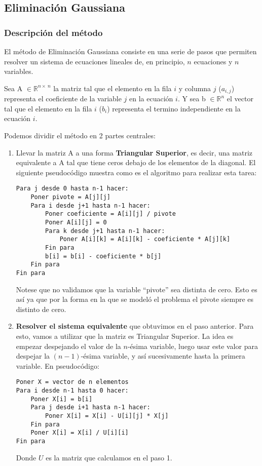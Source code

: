 \subsection{Eliminación Gaussiana}

\subsubsection{Descripción del método}

El método de Eliminación Gaussiana consiste en una serie de pasos que permiten resolver un sistema de ecuaciones lineales de, en principio, $n$ ecuaciones y $n$ variables.

Sea A $\in \mathbb{R}^{n \times\ n}$ la matriz tal que el elemento en la fila $i$ y columna $j$ ($a_{i,j}$) representa el coeficiente de la variable $j$ en la ecuación $i$.
Y sea b $\in \mathbb{R}^{n}$ el vector tal que el elemento en la fila $i$ ($b_{i}$) representa el termino independiente en la ecuación $i$.

Podemos dividir el método en 2 partes centrales:
\begin{enumerate}
    \item Llevar la matriz A a una forma \textbf{Triangular Superior}, es decir, una matriz equivalente a A tal que tiene ceros debajo de los elementos de la diagonal. El siguiente pseudocódigo muestra como es el algoritmo para realizar esta tarea:

\begin{lstlisting}
Para j desde 0 hasta n-1 hacer:
    Poner pivote = A[j][j]
    Para i desde j+1 hasta n-1 hacer:
        Poner coeficiente = A[i][j] / pivote
        Poner A[i][j] = 0
        Para k desde j+1 hasta n-1 hacer:
            Poner A[i][k] = A[i][k] - coeficiente * A[j][k]
        Fin para
        b[i] = b[i] - coeficiente * b[j]
    Fin para
Fin para
\end{lstlisting}

		Notese que no validamos que la variable ``pivote'' sea distinta de cero. Esto es así ya que por la forma en la que se modeló el problema el pivote siempre es distinto de cero.

    \item \textbf{Resolver el sistema equivalente} que obtuvimos en el paso anterior. Para esto, vamos a utilizar que la matriz es Triangular Superior. La idea es empezar despejando el valor de la $n$-ésima variable, luego usar este valor para despejar la $(n-1)$-ésima variable, y así sucesivamente hasta la primera variable. En pseudocódigo:

\begin{lstlisting}
Poner X = vector de n elementos
Para i desde n-1 hasta 0 hacer:
    Poner X[i] = b[i]
    Para j desde i+1 hasta n-1 hacer:
        Poner X[i] = X[i] - U[i][j] * X[j]
    Fin para
    Poner X[i] = X[i] / U[i][i]
Fin para
\end{lstlisting}

		Donde $U$ es la matriz que calculamos en el paso 1.

  \end{enumerate}
  

